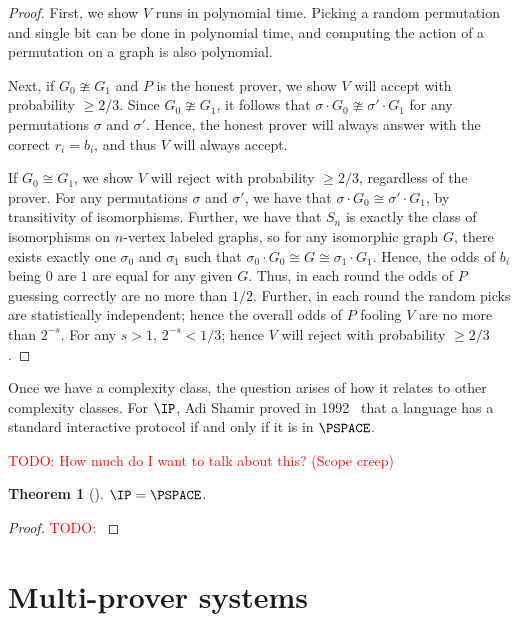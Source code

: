 \documentclass[english,12pt]{reedthesis}
\theoremstyle{plain}
\newtheorem{thm}{Theorem}[section]
\theoremstyle{definition}
\theoremstyle{remark}
\newcommand{\TODO}[1]{\textcolor{red}{TODO: #1}}
\begin{document}
\begin{proof}
  First, we show $V$ runs in polynomial time. Picking a random permutation and
  single bit can be done in polynomial time, and computing the action of a
  permutation on a graph is also polynomial.

  Next, if $G_{0} \ncong G_{1}$ and $P$ is the honest prover, we show $V$ will accept
  with probability $\ge 2/3$. Since $G_{0} \ncong G_{1}$, it follows that
  $\sigma \cdot G_{0} \ncong \sigma' \cdot G_{1}$ for any permutations $\sigma$ and $\sigma'$. Hence, the honest
  prover will always answer with the correct $r_{i} = b_{i}$, and thus $V$ will
  always accept.

  If $G_{0} \cong G_{1}$, we show $V$ will reject with probability $\ge 2/3$,
  regardless of the prover. For any permutations $\sigma$ and $\sigma'$, we have that
  $\sigma \cdot G_{0} \cong \sigma' \cdot G_{1}$, by transitivity of isomorphisms. Further, we have
  that $S_{n}$ is exactly the class of isomorphisms on $n$-vertex labeled
  graphs, so for any isomorphic graph $G$, there exists exactly one $\sigma_{0}$ and
  $\sigma_{1}$ such that $\sigma_{0} \cdot G_{0} \cong G \cong \sigma_{1} \cdot G_{1}$. Hence, the odds of
  $b_{i}$ being $0$ are $1$ are equal for any given $G$. Thus, in each round the
  odds of $P$ guessing correctly are no more than $1/2$. Further, in each round
  the random picks are statistically independent; hence the overall odds of $P$
  fooling $V$ are no more than $2^{-s}$. For any $s > 1$, $2^{-s} < 1/3$; hence
  $V$ will reject with probability $\ge 2/3$.
\end{proof}

Once we have a complexity class, the question arises of how it relates to other
complexity classes. For $\IP$, Adi Shamir proved in 1992~\cite{Sha92} that a
language has a standard interactive protocol if and only if it is in $\PSPACE$.

\TODO{How much do I want to talk about this? (Scope creep)}
\begin{thm}[{\cite{Sha92}}]\label{thm:ip-is-pspace}
  $\IP = \PSPACE$.
\end{thm}

\begin{proof}
  \TODO{}
\end{proof}

\section{Multi-prover systems}\label{sec:multi-prover}
\end{document}
